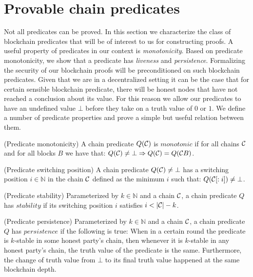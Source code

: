 \section{Provable chain predicates}

Not all predicates can be proved. In this section we characterize the class of
blockchain predicates that will be of interest to us for constructing proofs.
A useful property of predicates in our context is \textit{monotonicity}. Based
on predicate monotonicity, we show that a predicate has \textit{liveness} and
\textit{persistence}. Formalizing the security of our  blockchain proofs  will
be preconditioned on such blockchain predicates. Given that we are in a
decentralized setting it can be the case that for certain sensible blockchain
predicate, there will be honest nodes that have not reached a conclusion about
its value. For this reason we  allow our predicates to have an undefined value
$\bot$ before they take on a truth value of $0$ or $1$. We define a number of
predicate properties and prove a simple but useful relation between them.

\begin{definition}{(Predicate monotonicity)}
    A chain predicate $Q(\mathcal{C})$ is $\textit{monotonic}$ if for all chains
    $\mathcal{C}$ and for all blocks $B$ we have that:
    $    Q(\mathcal{C}) \neq \bot \Rightarrow Q(\mathcal{C}) = Q(\mathcal{C} B) $.

{(Predicate switching position)}
    A chain predicate $Q(\mathcal{C}) \neq \bot$ has a switching position $i \in
    \mathbb{N}$ in the chain $\mathcal{C}$ defined as the minimum $i$ such that:
 $       Q(\mathcal{C}[:i]) \neq \bot$.

 {(Predicate stability)}
    Parameterized by $k \in \mathbb{N}$ and a chain $\mathcal{C}$, a chain predicate
    $Q$ has $\textit{stability}$ if its switching position $i$ satisfies $i <
    |\mathcal{C}| - k$.

{(Predicate persistence)}
    Parameterized by $k \in \mathbb{N}$ and a chain $\mathcal{C}$, a chain predicate
    $Q$ has $\textit{persistence}$ if the following is true: When in a certain
    round the predicate is $k$-stable in some honest party's chain, then
    whenever it is $k$-stable in any honest party's chain, the truth value of
    the predicate is the same. Furthermore, the change of truth value from
    $\bot$ to its final truth value happened at the same blockchain depth.

\end{definition}

